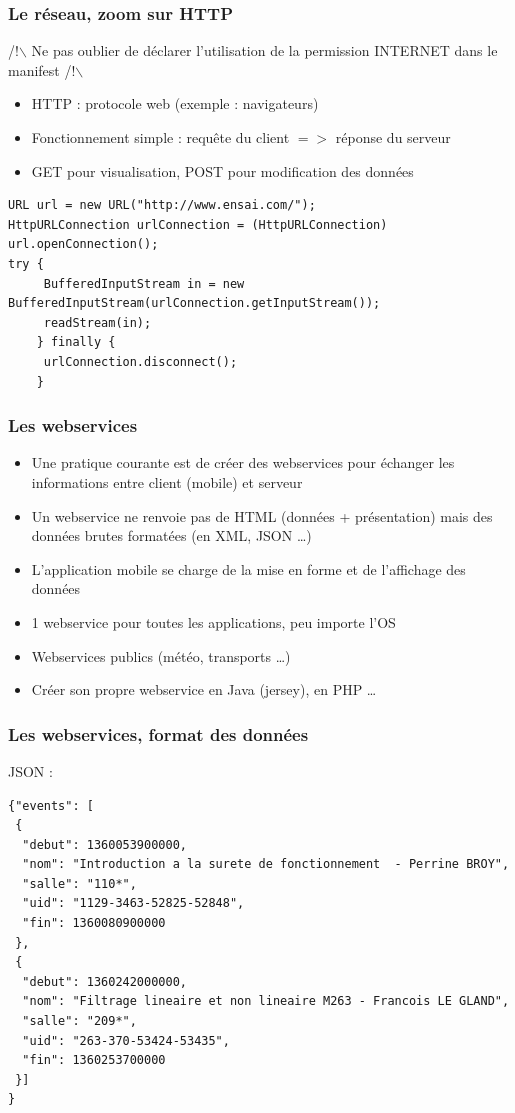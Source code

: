 \documentclass{beamer}
\begin{document}
\begin{frame}[fragile]
\frametitle{Le réseau, zoom sur HTTP}
/!$\backslash$ Ne pas oublier de déclarer l'utilisation de la permission
INTERNET dans le manifest /!$\backslash$
\begin{itemize}
  \item HTTP : protocole web (exemple : navigateurs)
  \item Fonctionnement simple : requête du client $=>$ réponse du serveur
  \item GET pour visualisation, POST pour modification des données
\end{itemize}
\begin{lstlisting}
URL url = new URL("http://www.ensai.com/");
HttpURLConnection urlConnection = (HttpURLConnection) url.openConnection();
try {
     BufferedInputStream in = new BufferedInputStream(urlConnection.getInputStream());
     readStream(in); 
    } finally {
     urlConnection.disconnect();
    }
\end{lstlisting}
\end{frame}
\begin{frame}[fragile]
\frametitle{Les webservices}
\begin{itemize}
  \item Une pratique courante est de créer des webservices pour échanger les informations entre client (mobile) et serveur
  \item Un webservice ne renvoie pas de HTML (données + présentation) mais des
  données brutes formatées (en XML, JSON \ldots)
  \item L'application mobile se charge de la mise en forme et de l'affichage des données
  \item 1 webservice pour toutes les applications, peu importe l'OS
  \item Webservices publics (météo, transports \ldots)
  \item Créer son propre webservice en Java (jersey), en PHP \ldots
\end{itemize}    
\end{frame}
\begin{frame}[fragile]
\frametitle{Les webservices, format des données}
JSON :
\begin{lstlisting}
{"events": [
 {
  "debut": 1360053900000,
  "nom": "Introduction a la surete de fonctionnement  - Perrine BROY",
  "salle": "110*",
  "uid": "1129-3463-52825-52848",
  "fin": 1360080900000
 },
 {
  "debut": 1360242000000,
  "nom": "Filtrage lineaire et non lineaire M263 - Francois LE GLAND",
  "salle": "209*",
  "uid": "263-370-53424-53435",
  "fin": 1360253700000
 }]
}
\end{lstlisting}
\end{frame}
\end{document}
